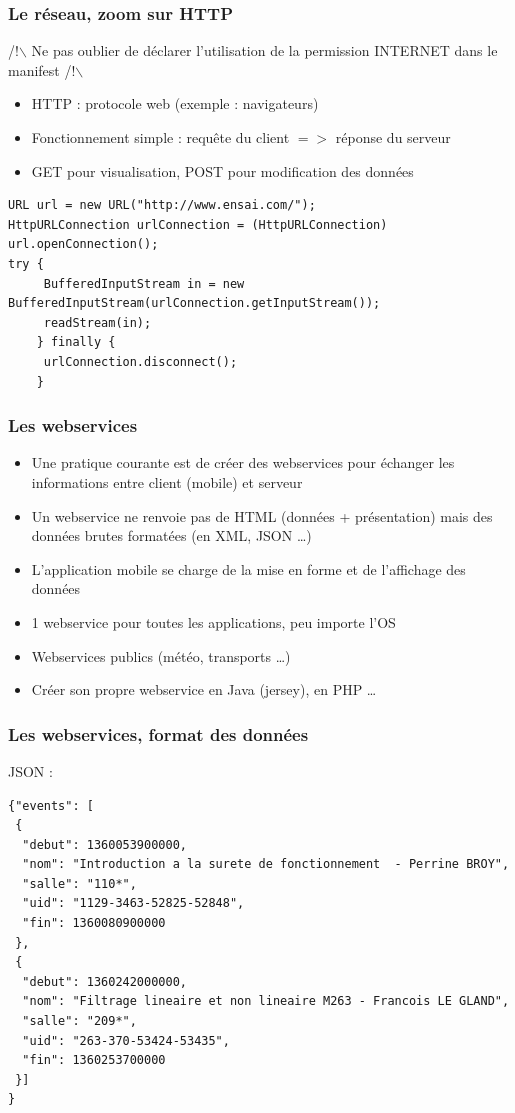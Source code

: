 \documentclass{beamer}
\begin{document}
\begin{frame}[fragile]
\frametitle{Le réseau, zoom sur HTTP}
/!$\backslash$ Ne pas oublier de déclarer l'utilisation de la permission
INTERNET dans le manifest /!$\backslash$
\begin{itemize}
  \item HTTP : protocole web (exemple : navigateurs)
  \item Fonctionnement simple : requête du client $=>$ réponse du serveur
  \item GET pour visualisation, POST pour modification des données
\end{itemize}
\begin{lstlisting}
URL url = new URL("http://www.ensai.com/");
HttpURLConnection urlConnection = (HttpURLConnection) url.openConnection();
try {
     BufferedInputStream in = new BufferedInputStream(urlConnection.getInputStream());
     readStream(in); 
    } finally {
     urlConnection.disconnect();
    }
\end{lstlisting}
\end{frame}
\begin{frame}[fragile]
\frametitle{Les webservices}
\begin{itemize}
  \item Une pratique courante est de créer des webservices pour échanger les informations entre client (mobile) et serveur
  \item Un webservice ne renvoie pas de HTML (données + présentation) mais des
  données brutes formatées (en XML, JSON \ldots)
  \item L'application mobile se charge de la mise en forme et de l'affichage des données
  \item 1 webservice pour toutes les applications, peu importe l'OS
  \item Webservices publics (météo, transports \ldots)
  \item Créer son propre webservice en Java (jersey), en PHP \ldots
\end{itemize}    
\end{frame}
\begin{frame}[fragile]
\frametitle{Les webservices, format des données}
JSON :
\begin{lstlisting}
{"events": [
 {
  "debut": 1360053900000,
  "nom": "Introduction a la surete de fonctionnement  - Perrine BROY",
  "salle": "110*",
  "uid": "1129-3463-52825-52848",
  "fin": 1360080900000
 },
 {
  "debut": 1360242000000,
  "nom": "Filtrage lineaire et non lineaire M263 - Francois LE GLAND",
  "salle": "209*",
  "uid": "263-370-53424-53435",
  "fin": 1360253700000
 }]
}
\end{lstlisting}
\end{frame}
\end{document}
